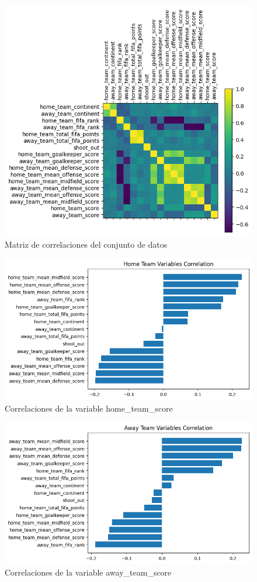 \begin{figure}[H]
    \centering
    \includegraphics[width=\textwidth]{images/correlationMatrix.png}
    \caption{Matriz de correlaciones del conjunto de datos}
    \label{Conjunto-Datos-Matriz-Correlaciones}
\end{figure}

\begin{figure}[H]
    \centering
    \includegraphics[width=\textwidth]{images/homeTeamCorrelation.png}
    \caption{Correlaciones de la variable home\_team\_score}
    \label{Conjunto-Datos-Home-Correlaciones}
\end{figure}

\begin{figure}[H]
    \centering
    \includegraphics[width=\textwidth]{images/awayTeamCorrelation.png}
    \caption{Correlaciones de la variable away\_team\_score}
    \label{Conjunto-Datos-Away-Correlaciones}
\end{figure}

\newpage